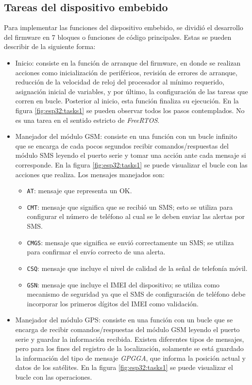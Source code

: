 \subsection{Tareas del dispositivo embebido}

Para implementar las funciones del dispositivo embebido, se dividió el desarrollo del firmware en 7 bloques o funciones de código principales. Estas se pueden describir de la siguiente forma:

\begin{itemize}
	\item Inicio: consiste en la función de arranque del firmware, en donde se realizan acciones como inicialización de periféricos, revisión de errores de arranque, reducción de la velocidad de reloj del procesador al mínimo requerido, asignación inicial de variables, y por último, la configuración de las tareas que corren en bucle. Posterior al inicio, esta función finaliza su ejecución. En la figura \ref{fig:esp32:tasks1} se pueden observar todos los pasos contemplados. No es una tarea en el sentido estricto de \textit{FreeRTOS}.
	\item Manejador del módulo GSM: consiste en una función con un bucle infinito que se encarga de cada pocos segundos recibir comandos/respuestas del módulo SMS leyendo el puerto serie y tomar una acción ante cada mensaje si corresponde. En la figura \ref{fig:esp32:tasks1} se puede visualizar el bucle con las acciones que realiza. Los mensajes manejados son:
		\begin{itemize}
			\item \texttt{AT}: mensaje que representa un OK.
			\item \texttt{CMT}: mensaje que significa que se recibió un SMS; esto se utiliza para configurar el número de teléfono al cual se le deben enviar las alertas por SMS.
			\item \texttt{CMGS}: mensaje que significa se envió correctamente un SMS; se utiliza para confirmar el envío correcto de una alerta.
			\item \texttt{CSQ}: mensaje que incluye el nivel de calidad de la señal de telefonía móvil.
			\item \texttt{GSN}: mensaje que incluye el IMEI del dispositivo; se utiliza como mecanismo de seguridad ya que el SMS de configuración de teléfono debe incorporar los primeros dígitos del IMEI como validación.		
		\end{itemize}
		\item Manejador del módulo GPS: consiste en una función con un bucle que se encarga de recibir comandos/respuestas del módulo GSM leyendo el puerto serie y guardar la información recibida. Existen diferentes tipos de mensajes, pero para los fines del registro de la localización, solamente se está guardado la información del tipo de mensaje \textit{GPGGA}, que informa la posición actual y datos de los satélites\citep{NMEA:2}. En la figura \ref{fig:esp32:tasks1} se puede visualizar el bucle con las operaciones.

\end{itemize}
